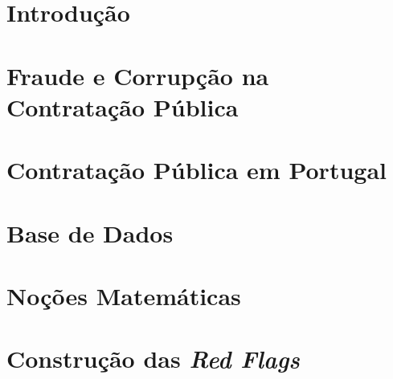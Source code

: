 \documentclass[11pt,openright]{book}
\begin{document}
\chapter{Introdução}




\chapter{Fraude e Corrupção na Contratação Pública}




\chapter{Contratação Pública em Portugal}




\chapter{Base de Dados}




\chapter{Noções Matemáticas}




\chapter{Construção das \textit{Red Flags}}



%




\clearemptydoublepage
\begin{footnotesize}
	\renewcommand{\bibname}{Bibliography}
	
	
	
\end{footnotesize}
\end{document}
